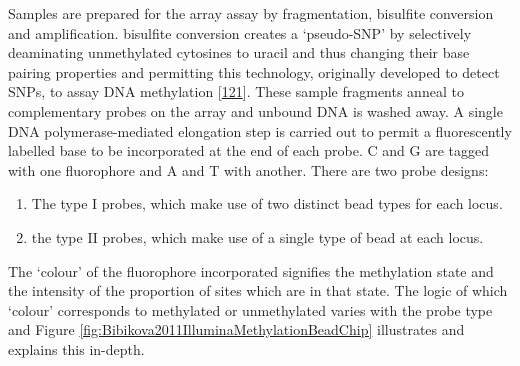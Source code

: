 \documentclass[
]{book}
\providecommand{\tightlist}{%
  \setlength{\itemsep}{0pt}\setlength{\parskip}{0pt}}
\begin{document}
Samples are prepared for the array assay by fragmentation, bisulfite conversion and amplification.
bisulfite conversion creates a `pseudo-SNP' by selectively deaminating unmethylated cytosines to uracil and thus changing their base pairing properties and permitting this technology, originally developed to detect SNPs, to assay DNA methylation {[}\protect\hyperlink{ref-Bibikova2006}{121}{]}.
These sample fragments anneal to complementary probes on the array and unbound DNA is washed away.
A single DNA polymerase-mediated elongation step is carried out to permit a fluorescently labelled base to be incorporated at the end of each probe.
C and G are tagged with one fluorophore and A and T with another.
There are two probe designs:

\begin{enumerate}
\def\labelenumi{\arabic{enumi}.}
\tightlist
\item
  The type I probes, which make use of two distinct bead types for each locus.
\item
  the type II probes, which make use of a single type of bead at each locus.
\end{enumerate}

The `colour' of the fluorophore incorporated signifies the methylation state and the intensity of the proportion of sites which are in that state.
The logic of which `colour' corresponds to methylated or unmethylated varies with the probe type and Figure \ref{fig:Bibikova2011IlluminaMethylationBeadChip} illustrates and explains this in-depth.
\end{document}
